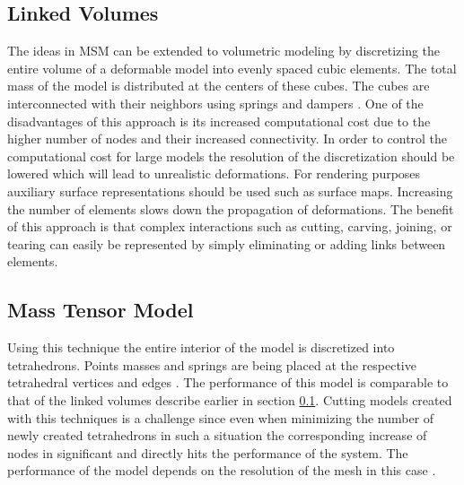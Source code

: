 \subsection{Linked Volumes}
\label{sec:linkedvolumes}
The ideas in MSM can be extended to volumetric modeling by discretizing the entire volume of a deformable model into evenly spaced cubic elements.
The total mass of the model is distributed at the centers of these cubes. The cubes are interconnected with their neighbors using springs and dampers
\cite{gibson1997simulating}. One of the disadvantages of this approach is its increased computational cost due to the higher number of nodes and
their increased connectivity. In order to control the computational cost for large models the resolution of the discretization should be lowered 
which will lead to unrealistic deformations. For rendering purposes auxiliary surface representations should be used such as surface maps. 
Increasing the number of elements slows down the propagation of deformations. The benefit of this approach is that complex interactions such as
cutting, carving, joining, or tearing can easily be represented by simply eliminating or adding links between elements.


\subsection{Mass Tensor Model}
Using this technique the entire interior of the model is discretized into tetrahedrons. Points masses and springs are 
being placed at the respective tetrahedral vertices and edges \cite{de1999modeling}. The performance of this model is comparable to that of the 
linked volumes describe earlier in section \ref{sec:linkedvolumes}. Cutting models created with this techniques is a challenge since even when
minimizing the number of newly created tetrahedrons in such a situation the corresponding increase of nodes in significant and directly hits the
performance of the system. The performance of the model depends on the resolution of the mesh in this case \cite{picinbono2000real}. 


